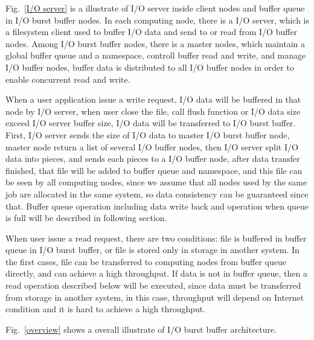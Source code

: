 Fig.~\ref{I/O server} is a illustrate of I/O server inside client nodes and buffer queue in I/O burst buffer nodes.
In each computing node, there is a I/O server, which is a filesystem client used to buffer I/O data and send to or read from I/O buffer nodes.
Among I/O burst buffer nodes, there is a master nodes, which maintain a global buffer queue and a namespace, controll buffer read and write, and manage I/O buffer nodes, buffer data is distributed to all I/O buffer nodes in order to enable concurrent read and write.

When a user application issue a write request, I/O data will be buffered in that node by I/O server, when user close the file, call flush function or I/O data size exceed I/O server buffer size, I/O data will be transferred to I/O burst buffer.
First, I/O server sends the size of I/O data to master I/O burst buffer node, master node return a list of several I/O buffer nodes, then I/O server split I/O data into pieces, and sends each pieces to a I/O buffer node, after data transfer finished, that file will be added to buffer queue and namespace, and this file can be seen by all computing nodes, since we assume that all nodes used by the same job are allocated in the same system, so data consistency can be guaranteed since that.
Buffer queue operation including data write back and operation when queue is full will be described in following section.

When user issue a read request, there are two conditions: file is buffered in buffer queue in I/O burst buffer, or file is stored only in storage in another system.
In the first cases, file can be transferred to computing nodes from buffer queue directly, and can achieve a high throughput.
If data is not in buffer queue, then a read operation described below will be executed, since data must be transferred from storage in another system, in this case, throughput will depend on Internet condition and it is hard to achieve a high throughput.

Fig.~\ref{overview} shows a overall illustrate of I/O burst buffer architecture.




